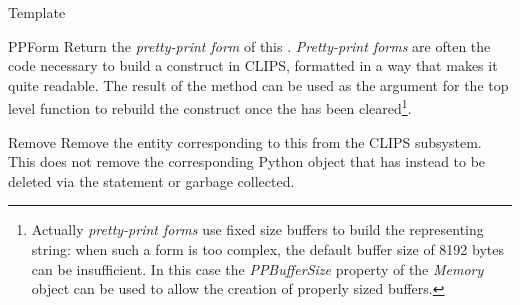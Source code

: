 \begin{classdesc*}{Template}
\begin{methoddesc}{PPForm}{}
Return the \emph{pretty-print form} of this .
\emph{Pretty-print forms} are often the code necessary to build a
construct in CLIPS, formatted in a way that makes it quite readable.
The result of the  method can be used as the argument
for the  top level function to rebuild the construct
once the  has been cleared\footnote{Actually
\emph{pretty-print forms} use fixed size buffers to build the representing
string: when such a form is too complex, the default buffer size of 8192
bytes can be insufficient. In this case the \emph{PPBufferSize} property
of the \emph{Memory} object can be used to allow the creation of properly
sized buffers.}.
\end{methoddesc}

\begin{methoddesc}{Remove}{}
Remove the entity corresponding to this  from the CLIPS
subsystem. This does not remove the corresponding Python object that has
instead to be deleted via the  statement or garbage
collected.
\end{methoddesc}


\end{classdesc*}
